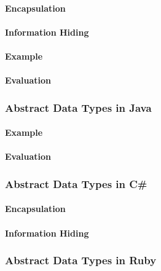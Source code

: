 \paragraph{Encapsulation}\label{par:Objective_C_Encapsulation}
\paragraph{Information Hiding}\label{par:Objective_C_Info_Hiding}
\paragraph{Example}\label{par:Objective_C_Abstract_Data_Type_Example}
\paragraph{Evaluation}\label{par:Objective_C_Abstract_Data_Type_Evaluation}

\subsubsection{Abstract Data Types in Java}\label{subsubsec:Abstract_Data_Types_Java}
\paragraph{Example}\label{par:Java_Abstract_Data_Type_Example}
\paragraph{Evaluation}\label{par:Java_Abstract_Data_Type_Evaluation}

\subsubsection{Abstract Data Types in C\#}\label{subsubsec:Abstract_Data_Types_CSharp}
\paragraph{Encapsulation}\label{par:Objective_C_Encapsulation}
\paragraph{Information Hiding}\label{par:Objective_C_Info_Hiding}

\subsubsection{Abstract Data Types in Ruby}\label{subsubsec:Abstract_Data_Types_Ruby}

